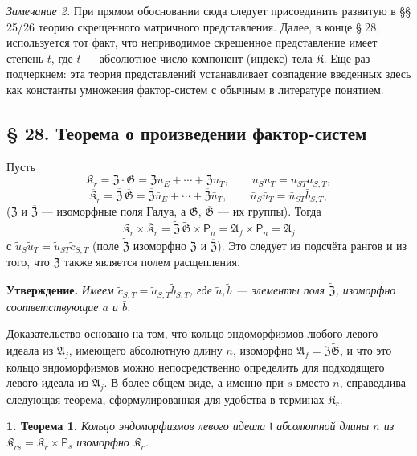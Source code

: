\documentclass[11pt]{article}
\begin{document}
\noindent\emph{Замечание 2.} При прямом обосновании сюда следует присоединить развитую в §§ 25/26 теорию скрещенного матричного представления. Далее, в конце § 28, используется тот факт, что неприводимое скрещенное представление имеет степень \(t\), где \(t\) --- абсолютное число компонент (индекс) тела \(\mathfrak K\). Еще раз подчеркнем: эта теория представлений устанавливает совпадение введенных здесь как константы умножения фактор-систем с обычным в литературе понятием.

\subsection*{§ 28. Теорема о произведении фактор-систем}\label{produktsatz-fuer-faktorensysteme}

Пусть
\[
\mathfrak K_r=\mathfrak Z\cdot\mathfrak G
=\mathfrak Zu_E+\cdots+\mathfrak Zu_T,
\qquad u_Su_T=u_{ST}a_{S,T},
\]
\[
\overline{\mathfrak K}_r
=\overline{\mathfrak Z}\,\overline{\mathfrak G}
=\overline{\mathfrak Z}\bar u_E+\cdots+\overline{\mathfrak Z}\bar u_T,
\qquad
\bar u_S\bar u_T=\bar u_{ST}\bar b_{S,T},
\]
(\(\mathfrak Z\) и \(\overline{\mathfrak Z}\) --- изоморфные поля Галуа, а \(\mathfrak G\), \(\overline{\mathfrak G}\) --- их группы). Тогда
\[
\mathfrak K_r\times\overline{\mathfrak K}_r
=\widetilde{\mathfrak Z}\,\widetilde{\mathfrak G}\times \mathsf{P}_n
=\mathfrak A_f\times \mathsf{P}_n
=\mathfrak A_j
\]
с \(\tilde u_S\tilde u_T=\tilde u_{ST}\tilde c_{S,T}\) (поле \(\widetilde{\mathfrak Z}\) изоморфно \(\mathfrak Z\) и \(\overline{\mathfrak Z}\)). Это следует из подсчёта рангов и из того, что \(\mathfrak Z\) также является полем расщепления.

\noindent\textbf{Утверждение.} \emph{Имеем \(\tilde c_{S,T}=\tilde a_{S,T}\tilde b_{S,T}\), где \(\tilde a,\tilde b\) --- элементы поля \(\widetilde{\mathfrak Z}\), изоморфно соответствующие \(a\) и \(\bar b\).}

Доказательство основано на том, что кольцо эндоморфизмов любого левого идеала из \(\mathfrak A_j\), имеющего абсолютную длину \(n\), изоморфно \(\mathfrak A_f=\widetilde{\mathfrak Z}\widetilde{\mathfrak G}\), и что это кольцо эндоморфизмов можно непосредственно определить для подходящего левого идеала из \(\mathfrak A_j\). В более общем виде, а именно при \(s\) вместо \(n\), справедлива следующая теорема, сформулированная для удобства в терминах \(\mathfrak K_r\).

\noindent\textbf{1. Теорема 1.} \emph{Кольцо эндоморфизмов левого идеала \(\mathfrak l\) абсолютной длины \(n\) из \(\mathfrak K_{rs}=\mathfrak K_r\times \mathsf{P}_s\) изоморфно \(\mathfrak K_r\).}
\end{document}
